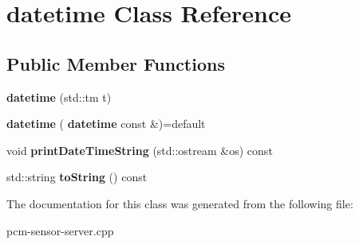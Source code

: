 \section{datetime Class Reference}
\label{classdatetime}
\subsection*{Public Member Functions}
\begin{DoxyCompactItemize}
\item 
\mbox{\label{classdatetime_a56fa07b0aa019c3542493255fce17057}} 
{\bfseries datetime} (std\+::tm t)
\item 
\mbox{\label{classdatetime_ad8d760f285f75a15ffed135faa9408ec}} 
{\bfseries datetime} (\textbf{ datetime} const \&)=default
\item 
\mbox{\label{classdatetime_ac392bf5ca63d5c88e37cbd36b9a97b69}} 
void {\bfseries print\+Date\+Time\+String} (std\+::ostream \&os) const
\item 
\mbox{\label{classdatetime_ae9c76336503d46e619a516e4736345a8}} 
std\+::string {\bfseries to\+String} () const
\end{DoxyCompactItemize}


The documentation for this class was generated from the following file\+:\begin{DoxyCompactItemize}
\item 
pcm-\/sensor-\/server.\+cpp\end{DoxyCompactItemize}

